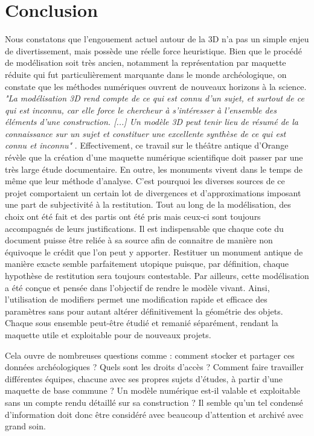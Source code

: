 		
\chapter*{Conclusion}

Nous constatons que l'engouement actuel autour de la 3D n'a pas un simple enjeu de divertissement, mais possède une réelle force heuristique. Bien que le procédé de modélisation soit très ancien, notamment la représentation par maquette réduite qui fut particulièrement marquante dans le monde archéologique, on constate que les méthodes numériques ouvrent de nouveaux horizons à la science. \textit{"La modélisation 3D rend compte de ce qui est connu d’un sujet, et surtout de ce qui est inconnu, car elle force le chercheur à s’intéresser à l’ensemble des éléments d’une construction. [...] Un modèle 3D peut tenir lieu de résumé de la connaissance sur un sujet et constituer une excellente synthèse de ce qui est connu et inconnu"} \cite[p. 249]{rocheleau}. Effectivement, ce travail sur le théâtre antique d'Orange révèle que la création d'une maquette numérique scientifique doit passer par une très large étude documentaire. En outre, les monuments vivent dans le temps de même que leur méthode d'analyse. C'est pourquoi les diverses sources de ce projet comportaient un certain lot de divergences et d'approximations imposant une part de subjectivité à la restitution. Tout au long de la modélisation, des choix ont été fait et des partis ont été pris mais ceux-ci sont toujours accompagnés de leurs justifications. Il est indispensable que chaque cote du document puisse être reliée à sa source afin de connaitre de manière non équivoque le crédit que l'on peut y apporter. Restituer un monument antique de manière exacte semble parfaitement utopique puisque, par définition, chaque hypothèse de restitution sera toujours contestable.
Par ailleurs, cette modélisation a été conçue et pensée dans l'objectif de rendre le modèle vivant. Ainsi, l'utilisation de \glspl{modifier} permet une modification rapide et efficace des paramètres sans pour autant altérer définitivement la géométrie des objets. Chaque sous ensemble peut-être étudié et remanié séparément, rendant la maquette utile et exploitable pour de nouveaux projets.

Cela ouvre de nombreuses questions comme : comment stocker et partager ces données archéologiques ? Quels sont les droits d'accès ? Comment faire travailler différentes équipes, chacune avec ses propres sujets d'études, à partir d'une maquette de base commune ? Un modèle numérique est-il valable et exploitable sans un compte rendu détaillé sur sa construction ? Il semble qu'un tel condensé d'information doit donc être considéré avec beaucoup d'attention et archivé avec grand soin. 

